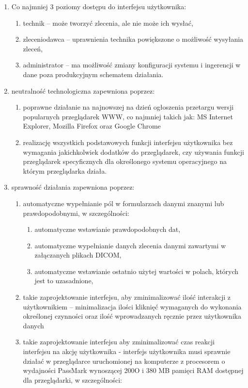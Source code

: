 \documentclass[a4paper]{report}
\begin{document}
\begin{enumerate}
    \item Co najmniej 3 poziomy dostępu do interfejsu użytkownika:
        \begin{enumerate}
        \item technik -- może tworzyć zlecenia, ale nie może ich wysłać,
        \item zleceniodawca -- uprawnienia technika powiększone o możliwość wysyłania zleceń,
        \item administrator -- ma możliwość zmiany konfiguracji systemu i ingerencji w dane poza produkcyjnym schematem działania.
        \end{enumerate}
    \item neutralność technologiczna zapewniona poprzez:
	  \begin{enumerate}
            \item poprawne działanie na najnowszej na dzień ogłoszenia przetargu wersji popularnych przeglądarek WWW, co najmniej takich jak: MS Internet Explorer, Mozilla Firefox oraz Google Chrome
            \item realizację wszystkich podstawowych funkcji interfejsu użytkownika bez wymagania jakichkolwiek dodatków do przeglądarek, czy używania funkcji przeglądarek specyficznych dla określonego systemu operacyjnego na którym przeglądarka działa.
	  \end{enumerate}
    \item sprawność działania zapewniona poprzez:
	  \begin{enumerate}
          \item automatyczne wypełnianie pól w formularzach danymi znanymi lub prawdopodobnymi, w szczególności:
            \begin{enumerate}
              \item automatyczne wstawianie prawdopodobnych dat,
              \item automatyczne wypełnianie danych zlecenia danymi zawartymi w załączanych plikach DICOM,
              \item automatyczne wstawianie ostatnio użytej wartości w polach, których jest to uzasadnione,
            \end{enumerate}
	  \item takie zaprojektowanie interfejsu, aby zminimalizować ilość interakcji z użytkownikiem -- minimalizacja ilości kliknięć wymaganych do wykonania określonej czynności oraz ilość wprowadzanych ręcznie przez użytkownika danych
	  \item takie zaprojektowanie interfejsu aby zminimalizować czas reakcji interfejsu na akcję użytkownika - interfejs użytkownika musi sprawnie działać w przeglądarce uruchomionej na komputerze z procesorem o wydajności PassMark wynoszącej 200O i 380 MB pamięci RAM dostępnej dla przeglądarki, w szczególności:

\end{enumerate}
\end{enumerate}
\end{document}
